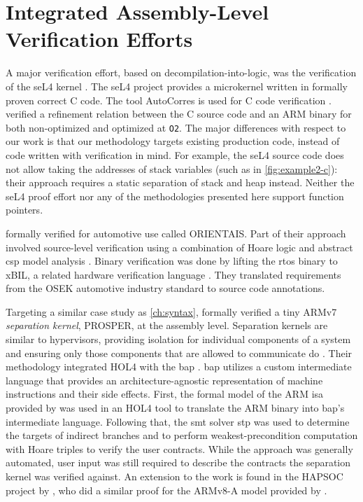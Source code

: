\section{Integrated Assembly-Level Verification Efforts}\label{se:integrated_assembly}
A major verification effort, based on decompilation-into-logic,
was the verification of the seL4 kernel \autocite{klein2009sel4,Klein_AEMSKH_14}.
The seL4 project provides a microkernel written in formally proven correct C code.
The tool AutoCorres is used for C code verification \autocite{greenaway2012bridging}.
\textcite{sewell2013tvv} verified a refinement relation between the C source code
and an ARM binary for both non-optimized and optimized at \lstinline{O2}.
The major differences with respect to our work
is that our methodology targets existing production code,
instead of code written with verification in mind.
For example, the seL4 source code does not allow taking the addresses of stack variables
(such as in \cref{fig:example2-c}):
their approach requires a static separation of stack and heap instead.
Neither the seL4 proof effort nor any of the methodologies presented here
support function pointers.

\textcite{shi2012orientais} formally verified  for automotive use
called ORIENTAIS.
Part of their approach involved source-level verification
using a combination of Hoare logic
and abstract \ac{csp} model analysis \autocite{hoare1978csp}.
Binary verification was done by lifting the \ac{rtos} binary to xBIL,
a related hardware verification language \autocite{shi2012xbil}.
They translated requirements from the OSEK automotive industry standard
to source code annotations.

Targeting a similar case study as \cref{ch:syntax},
\textcite{dam2013hypervisor,dam2013formal}
formally verified a tiny ARMv7 \emph{separation kernel},%
PROSPER, at the assembly level.
Separation kernels are similar to hypervisors,
providing isolation for individual components of a system and ensuring
only those components that are allowed to communicate do \autocite{rushby1981dvss}.
Their methodology integrated HOL4 with the \ac{bap} \autocite{brumley2011bap}.
\Ac{bap} utilizes a custom intermediate language
that provides an architecture-agnostic representation of machine instructions
and their side effects.
First, the formal model of the ARM \ac{isa} provided by \textcite{fox2010arm} was used
in an HOL4 tool to translate the ARM binary into \ac{bap}'s intermediate language.
Following that, the \ac{smt} solver \ac{stp} \cite{ganesh2007stp}
was used to determine the targets of indirect branches
and to perform weakest-precondition computation with Hoare triples
to verify the user contracts.
While the approach was generally automated,
user input was still required to describe the contracts
the separation kernel was verified against.
An extension to the work is found in the HAPSOC project by \textcite{baumann2016high},
who did a similar proof for the ARMv8-A model provided by \textcite{fox2015improved}.

